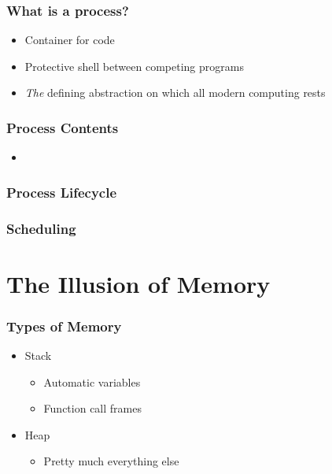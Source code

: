 \documentclass[pdftex]{beamer} %
\begin{document}
\begin{frame}
  \frametitle{What is a process?}
  \begin{itemize}
  \item Container for code
  \item Protective shell between competing programs
  \item \emph{The} defining abstraction on which all modern computing rests
  \end{itemize}
\end{frame}

\begin{frame}
  \frametitle{Process Contents}
  \begin{itemize}
  \item 
  \end{itemize}
\end{frame}

\begin{frame}
  \frametitle{Process Lifecycle}
  
\end{frame}

\begin{frame}
  \frametitle{Scheduling}
  
\end{frame}


\section{The Illusion of Memory}
\label{sec:memory}

\begin{frame}
  \frametitle{Types of Memory}
  \begin{itemize}
  \item Stack
    \begin{itemize}
    \item Automatic variables
    \item Function call frames
    \end{itemize}
\pause
  \item Heap
    \begin{itemize}
    \item Pretty much everything else
    \end{itemize}
  \end{itemize}
\end{frame}
\end{document}
